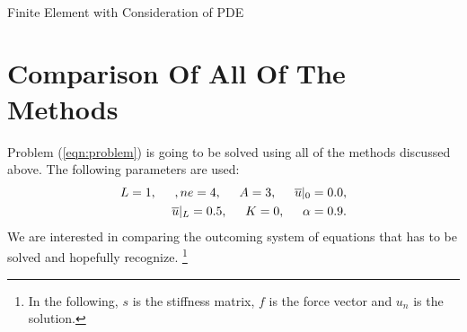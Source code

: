 \documentclass[a4paper,12pt]{article}
\makeatletter
\newenvironment{figurehere}
  {\def\@captype{figure}}
  {}
\makeatother
\begin{document}
\begin{center}
\begin{figurehere} 
\\
\caption{Finite Element with Consideration of PDE}\label{fig:femwithpde}
\end{figurehere}
\end{center}

\section{Comparison Of All Of The Methods}
Problem (\ref{eqn:problem}) is going to be solved using all of the methods discussed above. The following parameters are used:
\begin{eqnarray}
L = 1, \hspace{0.5cm}, ne = 4, \hspace{0.5cm}A= 3, \hspace{0.5cm}\overline{u}\vert_0 = 0.0,\\ 
\overline{u}\vert_L=0.5, \hspace{0.5cm}K = 0,\hspace{0.5cm}\alpha = 0.9.
\end{eqnarray}
We are interested in comparing the outcoming system of equations that has to be solved and hopefully recognize. \footnote{In the following, $s$ is the stiffness matrix, $f$ is the force vector and $u_n$ is the solution.}
\end{document}
